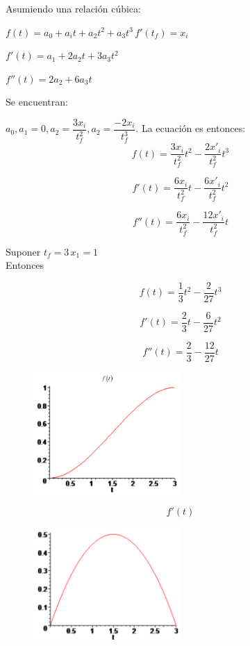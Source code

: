 Asumiendo una relación cúbica:

$f(t)=a_0 +a_it + a_2 t^2 + a_3 t^3 \, f'(t_f)= x_i$

$f'(t)=a_1 + 2a_2t + 3a_3 t^2$

$f''(t)=2a_2 + 6a_3t$

Se encuentran:

$a_0, a_1=0, a_2=\dfrac{3x_i}{t_f^2},a_2=\dfrac{-2x_i}{t_f^3}$. La ecuación es entonces:
$$
f(t)=\dfrac{3x_i}{t_{f}^2}t^2 - \dfrac{2x'_{i}}{t_{f}^2} t^3
$$

$$
f'(t)=\dfrac{6x_i}{t_{f}^2}t -  \dfrac{6x'_{i}}{t_{f}^2} t^2
$$

$$
f''(t)=\dfrac{6x_i}{t_{f}^2}- \dfrac{12x'_{i}}{t_{f}^2} t
$$

\begin{ejemplo}
	
	
	Suponer $ t_f = 3 \,  x_1=1$ \\
	Entonces
	
	$$f(t)=\dfrac{1}{3}t^2 - \dfrac{2}{27}t^3
	$$
	
	$$f'(t)=\dfrac{2}{3}t - \dfrac{6}{27}t^2$$
	
	$$f''(t)=\dfrac{2}{3} - \dfrac{12}{27}t$$
	
\end{ejemplo}


\begin{figure}[h!]
	\centering
	\includegraphics[width=0.5\textwidth]{images/img66.png}
	\label{figura66}
\end{figure}


$$
f'(t)$$
\begin{figure}[h!]
	\centering
	\includegraphics[width=0.5\textwidth]{images/img67.png}
	\label{figura67}
\end{figure}


